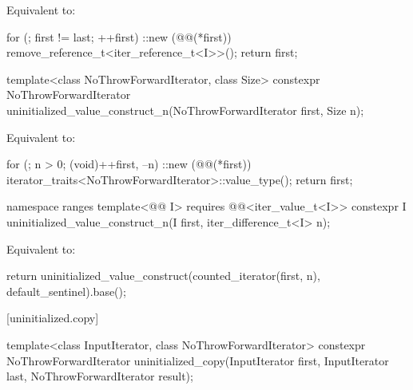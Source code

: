 \begin{itemdescr}
\pnum
\effects
Equivalent to:
\begin{codeblock}
for (; first != last; ++first)
  ::new (@@(*first)) remove_reference_t<iter_reference_t<I>>();
return first;
\end{codeblock}
\end{itemdescr}

%
\begin{itemdecl}
template<class NoThrowForwardIterator, class Size>
  constexpr NoThrowForwardIterator
    uninitialized_value_construct_n(NoThrowForwardIterator first, Size n);
\end{itemdecl}

\begin{itemdescr}
\pnum
\effects
Equivalent to:
\begin{codeblock}
for (; n > 0; (void)++first, --n)
  ::new (@@(*first)) iterator_traits<NoThrowForwardIterator>::value_type();
return first;
\end{codeblock}
\end{itemdescr}

%
\begin{itemdecl}
namespace ranges {
  template<@@ I>
    requires @@<iter_value_t<I>>
    constexpr I uninitialized_value_construct_n(I first, iter_difference_t<I> n);
}
\end{itemdecl}

\begin{itemdescr}
\pnum
\effects
Equivalent to:
\begin{codeblock}
return uninitialized_value_construct(counted_iterator(first, n),
                                     default_sentinel).base();
\end{codeblock}
\end{itemdescr}

[uninitialized.copy]{}

%
\begin{itemdecl}
template<class InputIterator, class NoThrowForwardIterator>
  constexpr NoThrowForwardIterator uninitialized_copy(InputIterator first, InputIterator last,
                                                      NoThrowForwardIterator result);
\end{itemdecl}

